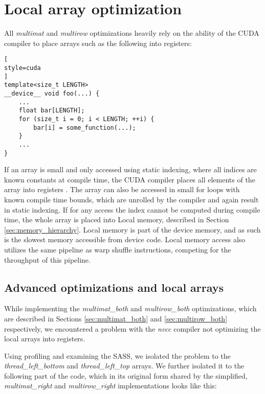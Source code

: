 \chapter{Local array optimization}

\label{sec:local_array_optimization}

All \textit{multimat} and \textit{multirow} optimizations heavily rely on the ability of the CUDA compiler to place arrays such as the following into registers:

\begin{lstlisting}[
style=cuda
]
template<size_t LENGTH>
__device__ void foo(...) {
	...
	float bar[LENGTH];
	for (size_t i = 0; i < LENGTH; ++i) {
		bar[i] = some_function(...);
	}
	...
}
\end{lstlisting}

If an array is small and only accessed using static indexing, where all indices are known constants at compile time, the CUDA compiler places all elements of the array into registers \citep{site:private_arrays_cuda}. The array can also be accessed in small for loops with known compile time bounds, which are unrolled by the compiler and again result in static indexing. If for any access the index cannot be computed during compile time, the whole array is placed into Local memory, described in Section \ref{sec:memory_hierarchy}. Local memory is part of the device memory, and as such is the slowest memory accessible from device code. Local memory access also utilizes the same pipeline as warp shuffle instructions, competing for the throughput of this pipeline. 


\section{Advanced optimizations and local arrays}
\label{sec:local_array_optimization_code_changes}

While implementing the \textit{multimat\_both} and \textit{multirow\_both} optimizations, which are described in  Sections \ref{sec:multimat_both} and \ref{sec:multirow_both} respectively, we encountered a problem with the \textit{nvcc} compiler not optimizing the local arrays into registers. 

Using profiling and examining the SASS, we isolated the problem to the \textit{thread\_left\_bottom} and \textit{thread\_left\_top} arrays. We further isolated it to the following part of the code, which in its original form shared by the simplified, \textit{multimat\_right} and \textit{multirow\_right} implementations looks like this:

